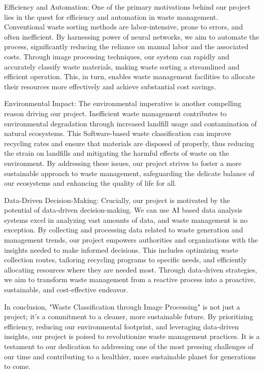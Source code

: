 \documentclass{article}
\begin{document}
Efficiency and Automation:
One of the primary motivations behind our project lies in the quest for efficiency and automation in waste management. Conventional waste sorting methods are labor-intensive, prone to errors, and often inefficient. By harnessing power of neural networks, we aim to automate the process, significantly reducing the reliance on manual labor and the associated costs. Through image processing techniques, our system can rapidly and accurately classify waste materials, making waste sorting a streamlined and efficient operation. This, in turn, enables waste management facilities to allocate their resources more effectively and achieve substantial cost savings.

Environmental Impact:
The environmental imperative is another compelling reason driving our project. Inefficient waste management contributes to environmental degradation through increased landfill usage and contamination of natural ecosystems. This Software-based waste classification can improve recycling rates and ensure that materials are disposed of properly, thus reducing the strain on landfills and mitigating the harmful effects of waste on the environment. By addressing these issues, our project strives to foster a more sustainable approach to waste management, safeguarding the delicate balance of our ecosystems and enhancing the quality of life for all.

Data-Driven Decision-Making:
Crucially, our project is motivated by the potential of data-driven decision-making. We can use AI based data analysis systems excel in analyzing vast amounts of data, and waste management is no exception. By collecting and processing data related to waste generation and management trends, our project empowers authorities and organizations with the insights needed to make informed decisions. This includes optimizing waste collection routes, tailoring recycling programs to specific needs, and efficiently allocating resources where they are needed most. Through data-driven strategies, we aim to transform waste management from a reactive process into a proactive, sustainable, and cost-effective endeavor.

In conclusion, "Waste Classification through Image Processing" is not just a project; it's a commitment to a cleaner, more sustainable future. By prioritizing efficiency, reducing our environmental footprint, and leveraging data-driven insights, our project is poised to revolutionize waste management practices. It is a testament to our dedication to addressing one of the most pressing challenges of our time and contributing to a healthier, more sustainable planet for generations to come.
\end{document}
